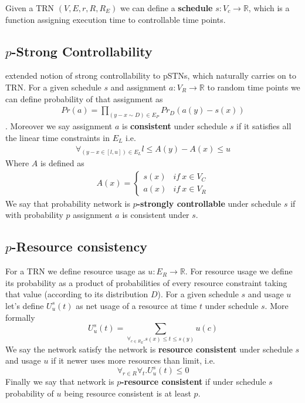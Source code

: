 \documentclass{article}
\begin{document}
\begin{multicols}{2}
\noindent Given a TRN $(V,E,r,R,R_E)$ we can define a \textbf{schedule} $s: V_c \rightarrow \mathbb{R}$, which is a function assigning execution time to controllable time points.
\subsection{$p$-Strong Controllability}
\cite{Fang2014} extended notion of strong controllability to pSTNs, which naturally carries on to TRN.  For a given schedule $s$ and assignment $a: V_R \rightarrow \mathbb{R}$ to random time points we can define probability of that assignment as
\begin{align*}
Pr(a) = \prod_{(y-x \sim D) \in E_P} Pr_D(a(y)-s(x))
\end{align*}.
Moreover we say assignment $a$ is \textbf{consistent} under schedule $s$ if it satisfies all the linear time constraints in $E_L$ i.e.
\begin{align*}
\forall_{(y-x \in [l,u]) \in E_L} l \leq A(y) - A(x) \leq u
\end{align*}
Where $A$ is defined as
\begin{align*}
A(x)=\begin{cases}
s(x) & if\ x \in V_C\\
a(x) & if\ x \in V_R
\end{cases}
\end{align*}
We say that probability network is \textbf{$p$-strongly controllable} under schedule $s$ if with probability $p$ assignment $a$ is consistent under $s$.

\subsection{$p$-Resource consistency}
For a TRN we define resource usage as $u:E_R \rightarrow \mathbb{R}$. For resource usage we define its probability as a product of probabilities of every resource constraint taking that value (according to its distribution $D$).
For a given schedule $s$ and usage $u$ let's define $U_u^s(t)$ as net usage of a resource at time $t$ under schedule $s$. More formally
\[
U_u^s(t) = \sum_{\forall_{c \in R_E}. s(x)\leq t \leq s(y)} u(c)
\]
We say the network satisfy the network is \textbf{resource consistent} under schedule $s$ and usage $u$ if it newer uses more resources than limit, i.e.
\[
\forall_{r \in R} \forall_{t} . U_u^s(t) \leq 0
\]
Finally we say that network is \textbf{$p$-resource consistent} if under schedule $s$ probability of $u$ being resource consistent is at least $p$.

\end{multicols}
\end{document}
